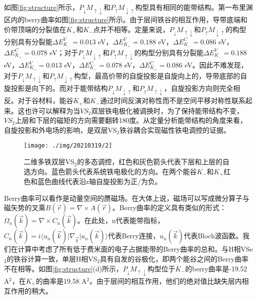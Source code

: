 \documentclass[reprint, aps, prb, showkeys]{revtex4-2}
\begin{document}
如图\ref{fig:structure}所示，$P_{\downarrow}M_{\uparrow\downarrow}$和$P_{\uparrow}M_{\downarrow\uparrow}$构型具有相同的能带结构。第一布里渊区内的berry曲率如图\ref{fig:structure}所示。由于层间铁谷的相互作用，导带底端和价带顶端的分裂值在$K_{+}$和$K_{-}$点并不相等。定量来说，$P_{\downarrow}M_{\uparrow\downarrow}$和$P_{\uparrow}M_{\downarrow\uparrow}$的构型分别具有分裂能$\Delta E_{K_-}^V = 0.013$ eV，$\Delta E_{K_+}^V = 0.188$ eV，$\Delta E_{K_-}^C = 0.086$ eV，$\Delta E_{K_+}^C = 0.078$ eV；对于$P_{\downarrow}M_{\downarrow\uparrow}$和$P_{\uparrow}M_{\uparrow\downarrow}$的构型分别具有分裂能$\Delta E_{K_-}^V = 0.188$ eV，$\Delta E_{K_+}^V = 0.013$ eV，$\Delta E_{K_-}^C = 0.078$ eV，$\Delta E_{K_+}^C = 0.086$ eV。因此不难发现，对于$P_{\downarrow}M_{\uparrow\downarrow}$和$P_{\uparrow}M_{\downarrow\uparrow}$构型，最高价带的自旋投影是自旋向上的，导带底部的自旋投影是向下的。而对于能带结构$P_{\downarrow}M_{\downarrow\uparrow}$和$P_{\uparrow}M_{\uparrow\downarrow}$，自旋投影方向则完全相反。对于谷材料，能谷$K_+$和$K_-$通过时间反演对称性而不是空间平移对称性联系起来。这也许可以解释为当$VS_{2}$双层铁电极化被调换时，为了保持能带结构不变，$VS_{2}$上层和下层的磁矩的方向需要翻转180度。从定量分析能带结构的角度来看，自旋投影和外电场的影响，是双层VS$_2$铁谷耦合实现磁性铁电调控的证据。

\begin{figure}[t]
    \texttt{[image: ./img/20210319/2]}
    \caption{\label{fig:multistate} 
    二维多铁双层VS$_2$的多态调控，红色和灰色箭头代表下层和上层的自选方向。蓝色箭头代表系统铁电极化的方向。在两个能谷$K_-$和$K_+$红色和蓝色曲线代表沿z轴自旋投影为正/为负。
    }
\end{figure}

Berry曲率可以看作是动量空间的赝磁场。在大体上说，磁场可以写成微分算子与磁矢势的叉乘$B(\vec{r}) = \nabla \times A(\vec{r})$。Berry曲率的定义具有类似的形式：$\Omega_n(\vec{k}) = \nabla \times C_n(\vec{k})$。在此处，n代表能带指标，$C_n(\vec{k}) = i \langle u_n(\vec{k}) \vert \nabla_{\vec{k}} \vert u_n(\vec{k}) \rangle $代表Berry连接，$u_n(\vec{k})$代表Bloch波函数。我们在计算中考虑了所有低于费米面的电子占据能带的Berry曲率的总和。与H相VSe$_2$的铁谷计算一致，单层H相VS$_2$具有自发的谷极化，即两个能谷之间的Berry曲率不在相等。如图\ref{fig:structure}(d)所示，$P_{\downarrow}M_{\uparrow\downarrow}$构型位于$K_-$的berry曲率是-19.52 A$^2$，在$K_+$的曲率是19.58 A$^2$。由于层间的相互作用，他们的绝对值比缺失层内相互作用的稍大。
\end{document}
